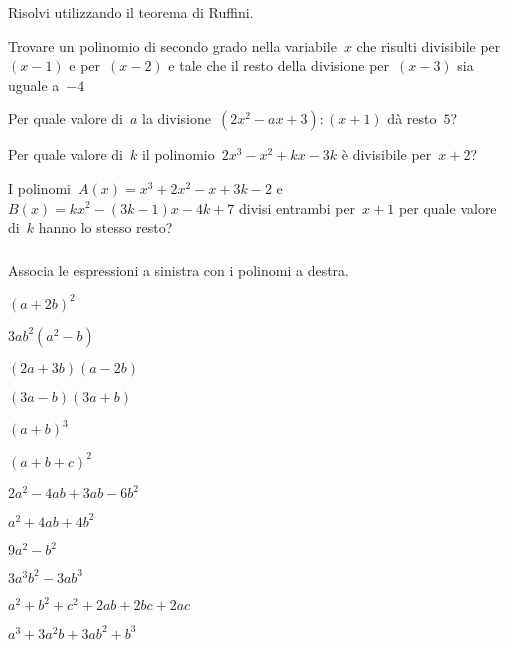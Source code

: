 \begin{esercizio}[*]
\label{ese:div.007}
Risolvi utilizzando il teorema di Ruffini.
\begin{enumeratea}
\item Trovare un polinomio di secondo grado nella variabile~\(x\) che 
risulti divisibile per~\((x-1)\) e per~\((x-2)\) e tale che il resto 
della divisione per~\((x-3)\) sia uguale a~\(-4\) 
\item Per quale valore di~\(a\) la 
divisione~\(\left(2x^{2}-ax+3\right):(x+1)\) dà resto~\(5\)? 
\item Per quale valore di~\(k\) il 
polinomio~\(2x^{3}-x^{2}+kx-3k\) è divisibile per~\(x+2\)? 
\item I polinomi~\(A(x)=x^3+2x^2-x+3k-2\) e~\(B(x)=kx^2-(3k-1)x-4k+7\) 
divisi entrambi per~\(x+1\) per quale valore di~\(k\) hanno lo stesso resto? 
\end{enumeratea}
\end{esercizio}

\subsubsection*{}

\begin{esercizio}
\label{ese:div.008}
Associa le espressioni a sinistra con i polinomi a destra.
\begin{htmulticols}{2}
\begin{enumeratea}
\item \((a+2b)^{2}\)
\item \(3ab^{2}(a^{2}-b)\)
\item \((2a+3b)(a-2b)\)
\item \((3a-b)(3a+b)\)
\item \((a+b)^{3}\)
\item \((a+b+c)^{2}\)
\item \(2a^{2}-4ab+3ab-6b^{2}\)
\item \(a^{2}+4ab+4b^{2}\)
\item \(9a^{2}-b^{2}\)
\item \(3a^{3}b^{2}-3ab^{3}\)
\item \(a^{2}+b^{2}+c^{2}+2ab+2bc+2ac\)
\item \(a^{3}+3a^{2}b+3ab^{2}+b^{3}\)
\end{enumeratea}
\end{htmulticols}
\end{esercizio}

